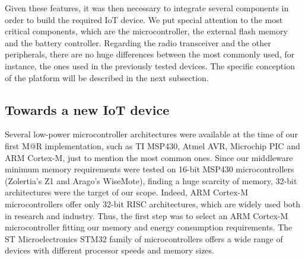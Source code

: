 Given these features, it was then necessary to integrate several components in order to build the required IoT device.
We put special attention to the most critical components, which are the microcontroller, the external flash memory and the battery controller.
Regarding the radio transceiver and the other peripherals, there are no huge differences between the most commonly used, for instance, the ones used in the previously tested devices.
The specific conception of the platform will be described in the next subsection.

\subsection{Towards a new IoT device}

Several low-power microcontroller architectures were available at the time of our first M@R implementation, such as TI MSP430, Atmel AVR, Microchip PIC and ARM Cortex-M, just to mention the most common ones.
Since our middleware minimum memory requirements were tested on 16-bit MSP430 microcontrollers (Zolertia's Z1 and Arago's WiseMote), finding a huge scarcity of memory, 32-bit architectures were the target of our scope.
Indeed, ARM Cortex-M microcontrollers offer only 32-bit RISC architectures, which are widely used both in research and industry.
Thus, the first step was to select an ARM Cortex-M microcontroller fitting our memory and energy consumption requirements.
The ST Microelectronics STM32 family of microcontrollers offers a wide range of devices with different processor speeds and memory sizes.


